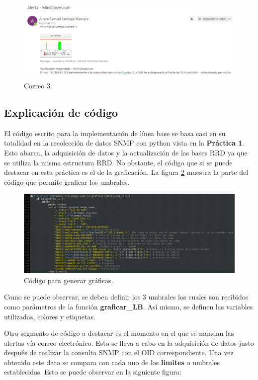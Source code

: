 \FloatBarrier
\begin{figure}[htbp!]
		\centering
			\includegraphics[width=1 \textwidth]{images/correo3}
		\caption{Correo 3.}
		\label{image:correo3}
\end{figure}
\FloatBarrier

\subsection{Explicación de código}
El código escrito para la implementación de línea base se basa casi en su totalidad en la recolección de datos SNMP con python vista en la \textbf{Práctica 1}. Esto abarca, la adquisición de datos y la actualización de las bases RRD ya que se utiliza la misma estructura RRD. No obstante, el código que si se puede destacar en esta práctica es el de la graficación. La figura \ref{image:codigo-graficacion} muestra la parte del código que permite graficar los umbrales.

\FloatBarrier
\begin{figure}[htbp!]
		\centering
			\includegraphics[width=.9 \textwidth]{images/codigo-graficacion}
		\caption{Código para generar gráficas.}
		\label{image:codigo-graficacion}
\end{figure}
\FloatBarrier

Como se puede observar, se deben definir los 3 umbrales los cuales son recibidos como parámetros de la función \textbf{graficar\_LB}. Así mismo, se definen las variables utilizadas, colores y etiquetas.

Otro segmento de código a destacar es el momento en el que se mandan las alertas vía correo electrónico. Esto se lleva a cabo en la adquisición de datos justo después de realizar la consulta SNMP con el OID correspondiente. Una vez obtenido este dato se compara con cada uno de los \textbf{limites} o umbrales establecidos. Esto se puede observar en la siguiente figura: 

